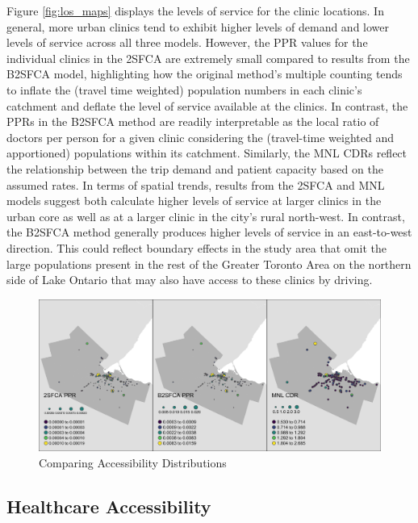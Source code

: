 \documentclass[]{elsarticle} %
\begin{document}
Figure \ref{fig:los_maps} displays the levels of service for the clinic
locations. In general, more urban clinics tend to exhibit higher levels
of demand and lower levels of service across all three models. However,
the PPR values for the individual clinics in the 2SFCA are extremely
small compared to results from the B2SFCA model, highlighting how the
original method's multiple counting tends to inflate the (travel time
weighted) population numbers in each clinic's catchment and deflate the
level of service available at the clinics. In contrast, the PPRs in the
B2SFCA method are readily interpretable as the local ratio of doctors
per person for a given clinic considering the (travel-time weighted and
apportioned) populations within its catchment. Similarly, the MNL CDRs
reflect the relationship between the trip demand and patient capacity
based on the assumed rates. In terms of spatial trends, results from the
2SFCA and MNL models suggest both calculate higher levels of service at
larger clinics in the urban core as well as at a larger clinic in the
city's rural north-west. In contrast, the B2SFCA method generally
produces higher levels of service in an east-to-west direction. This
could reflect boundary effects in the study area that omit the large
populations present in the rest of the Greater Toronto Area on the
northern side of Lake Ontario that may also have access to these clinics
by driving.

\begin{figure}
\includegraphics[width=1\linewidth]{./img/los_maps} \caption{\label{fig:los_maps}Comparing Accessibility Distributions}\label{fig:los_maps_fig}
\end{figure}

\hypertarget{healthcare-accessibility}{%
\subsection{Healthcare Accessibility}\label{healthcare-accessibility}}
\end{document}

